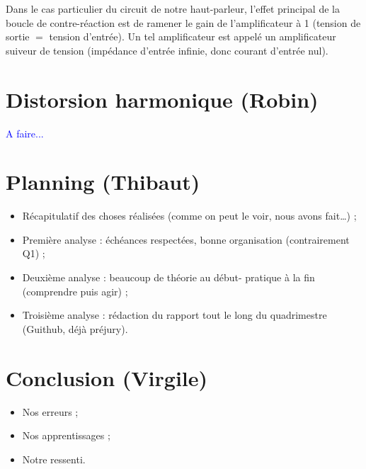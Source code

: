 \documentclass{article}
\begin{document}
Dans le cas particulier du circuit de notre haut-parleur, l'effet principal de la boucle de contre-réaction
est de ramener le gain de l'amplificateur à 1 (tension de sortie $=$ tension d'entrée). Un tel amplificateur
est appelé un amplificateur suiveur de tension (impédance d'entrée infinie, donc courant d'entrée nul).

\section{Distorsion harmonique (Robin)}

\textcolor{blue}{A faire...}

\section{Planning (Thibaut)}

\begin{itemize}
	\item Récapitulatif des choses réalisées (comme on peut le voir, nous avons fait…) ;
	\item Première analyse : échéances respectées, bonne organisation (contrairement Q1) ;
	\item Deuxième analyse : beaucoup de théorie au début- pratique à la fin  (comprendre puis agir) ;
	\item Troisième analyse : rédaction du rapport tout le long du quadrimestre (Guithub, déjà préjury).
\end{itemize}

\section{Conclusion (Virgile)}
\begin{itemize}
    \item Nos erreurs ;
    \item Nos apprentissages ;
    \item Notre ressenti.
\end{itemize}
		
\end{document}
